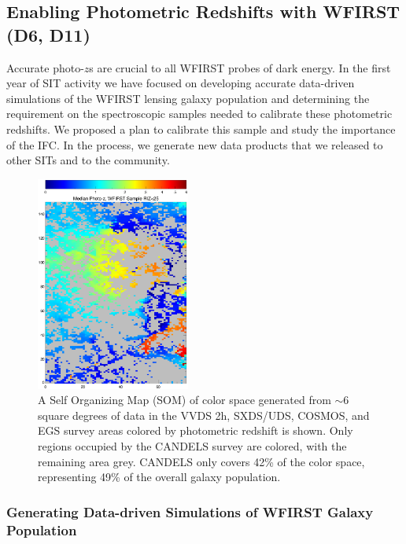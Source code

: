 \subsection{Enabling Photometric Redshifts with WFIRST (D6, D11)}
\label{sec:wl_photoz}

\begin{summaryii}
Accurate photo-$z$s are crucial to all WFIRST probes of dark energy. In the
first year of SIT activity we have focused on developing accurate data-driven
simulations of the WFIRST lensing galaxy population and determining the
requirement on the spectroscopic samples needed to calibrate these photometric
redshifts. We proposed a plan to calibrate this sample and study the importance of the IFC. In the process, we generate new
data products that we released to other SITs and to the community.
\end{summaryii}

\begin{figure}
 \includegraphics[width=0.45\textwidth] {./plots/wfirst_color_dist.eps}
\caption{A Self Organizing Map (SOM) \citep{Masters2015} of color space generated from $\sim6$ square degrees of data in the VVDS 2h, SXDS/UDS, COSMOS, and EGS survey areas colored by photometric redshift is shown.  Only regions occupied by the CANDELS survey are colored, with the remaining area grey.  CANDELS only covers 42\% of the color space, representing 49\% of the overall galaxy population.}
\label{fig:EuclidCandelsRep}
\end{figure}

\subsubsection{Generating Data-driven Simulations of WFIRST Galaxy Population}
\label{sec:candels}

